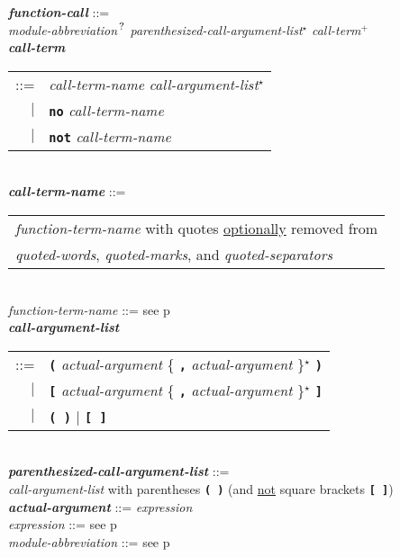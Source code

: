 \documentclass[12pt]{article}
\newcommand{\TT}[1]{{\tt \bfseries #1}}
\newcommand{\STAR}{{\Large $^\star$}}
\newcommand{\PLUS}[1][]{{$^{+#1}$}}
\newcommand{\QMARK}{{$^{\,\mbox{\footnotesize ?}}$}}
\newcommand{\ttkey}[1]{{\tt \bfseries #1}}
\newcommand{\emkey}[1]{{\em \bfseries #1}}
\newcommand{\pagref}[1]{p\pageref{#1}}
\newenvironment{indpar}[1][0.3in]%
	{\begin{list}{}%
		     {\setlength{\itemsep}{0in}%
		      \setlength{\topsep}{0in}%
		      \setlength{\parsep}{1ex}%
		      \setlength{\labelwidth}{#1}%
		      \setlength{\leftmargin}{#1}%
		      \addtolength{\leftmargin}{\labelsep}}%
	 \item}%
	{\end{list}}
\begin{document}
\begin{indpar}
\emkey{function-call}\label{FUNCTION-CALL} ::= \\
\hspace*{0.5in}
        {\em module-abbreviation}\QMARK{}
        {\em parenthesized-call-argument-list}\STAR{}
        {\em call-term}\PLUS{}
\\[0.5ex]
\emkey{call-term}\label{CALL-TERM}
    \begin{tabular}[t]{rl}
    ::= & {\em call-term-name} {\em call-argument-list}\STAR{} \\
    $|$ & \ttkey{no} {\em call-term-name} \\
    $|$ & \ttkey{not} {\em call-term-name} \\
    \end{tabular}
\\[0.5ex]
\emkey{call-term-name}\label{CALL-TERM-NAME} ::=
    \begin{tabular}[t]{@{}l}
    {\em function-term-name} with quotes \underline{optionally} removed from \\
    {\em quoted-words}, {\em quoted-marks}, and {\em quoted-separators}
    \end{tabular}
\\[0.5ex]
{\em function-term-name} ::= see \pagref{FUNCTION-TERM-NAME}
\\[0.5ex]
\emkey{call-argument-list}\label{CALL-ARGUMENT-LIST}
    \begin{tabular}[t]{rl}
    ::= & \TT{(} {\em actual-argument}
          \{ \TT{,} {\em actual-argument} \}\STAR{} \TT{)} \\
    $|$ & \TT{[} {\em actual-argument}
          \{ \TT{,} {\em actual-argument} \}\STAR{} \TT{]} \\
    $|$ & \TT{(~)} $|$ \TT{[~]} \\
    \end{tabular}
\\[0.5ex]
\emkey{parenthesized-call-argument-list}%
    \label{PARENTHESIZED-CALL-ARGUMENT-LIST} ::= \\
\hspace*{0.5in}
    {\em call-argument-list} with parentheses \TT{(~)}
    (and \underline{not} square brackets \TT{[~]})
\\[0.5ex]
\emkey{actual-argument} ::= {\em expression}
\\[0.5ex]
{\em expression} ::= see \pagref{EXPRESSION}
\\[0.5ex]
{\em module-abbreviation} ::= see \pagref{MODULE-ABBREVIATION}
\begin{enumerate}

\end{enumerate}
\end{indpar}
\end{document}
